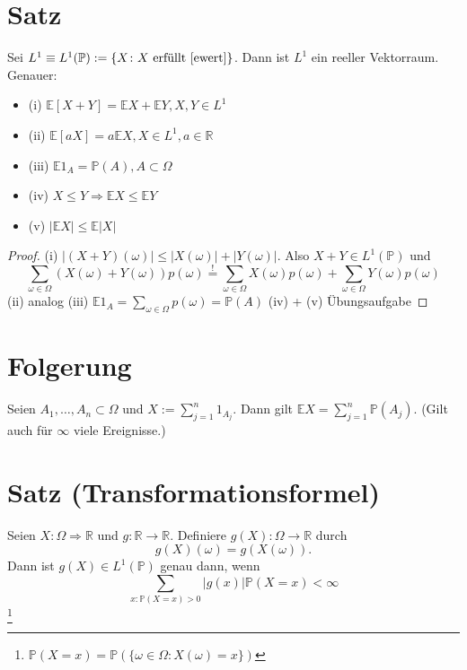 \documentclass[a4paper,11pt,notitlepage]{report}
\newcommand{\R}{{\ensuremath{\mathbb{R}}}}
\newcommand{\Prim}{{\ensuremath{\mathbb{P}}}}
\newcommand{\E}{{\ensuremath{\mathbb{E}}}}
\begin{document}
\section{Satz}
Sei $L^1 \equiv L^1(\Prim) := \{X \colon X \text{ erfüllt } \ref{ewert} \}$. Dann ist $L^1$ ein reeller Vektorraum. Genauer:
\begin{itemize}
	\item (i) $\E [X+Y] = \E X + \E Y, X,Y \in L^1$
	\item (ii) $\E [aX] = a \E X, X \in L^1, a \in \R$
	\item (iii) $\E 1_A = \Prim(A), A \subset \Omega$
	\item (iv) $X \leq Y \Rightarrow \E X \leq \E Y$
	\item (v) $|\E X| \leq \E |X|$
\end{itemize}

\begin{proof}
	(i) $|(X+Y)(\omega)| \leq |X(\omega)| + |Y(\omega)|$.
	\newline
	Also $X+Y \in L^1(\Prim)$ und
	$$\sum\limits_{\omega \in \Omega}{(X(\omega)+Y(\omega)) p(\omega)} \overset{!}{=} \sum\limits_{\omega \in \Omega}{X(\omega)p(\omega)} + \sum\limits_{\omega \in \Omega}{Y(\omega)p(\omega)}$$
	(ii) analog
	\newline
	(iii) $\E 1_A = \sum\limits_{\omega \in \Omega}{p(\omega)}=\Prim(A)$
	\newline
	(iv) + (v) Übungsaufgabe
\end{proof}

\section{Folgerung}
\label{folg}
Seien $A_1, \ldots, A_n \subset \Omega$ und $X := \sum\limits_{j=1}^{n}{1_{A_j}}$. Dann gilt $\E X = \sum\limits_{j=1}^{n}{\Prim(A_j)}$. \newline
(Gilt auch für $\infty$ viele Ereignisse.)

\section{Satz (Transformationsformel)}
Seien $X \colon \Omega \Rightarrow \R$ und $g \colon \R \rightarrow \R$. Definiere $g(X) \colon \Omega \rightarrow \R$ durch $$g(X)(\omega) = g(X(\omega)).$$ Dann ist $g(X) \in L^1(\Prim)$ genau dann, wenn
$$\sum\limits_{x \colon \Prim(X=x)>0}{|g(x)| \Prim(X=x)} < \infty$$\footnote{$\Prim(X=x) = \Prim(\{\omega \in \Omega \colon X(\omega)=x\})$}
\end{document}
